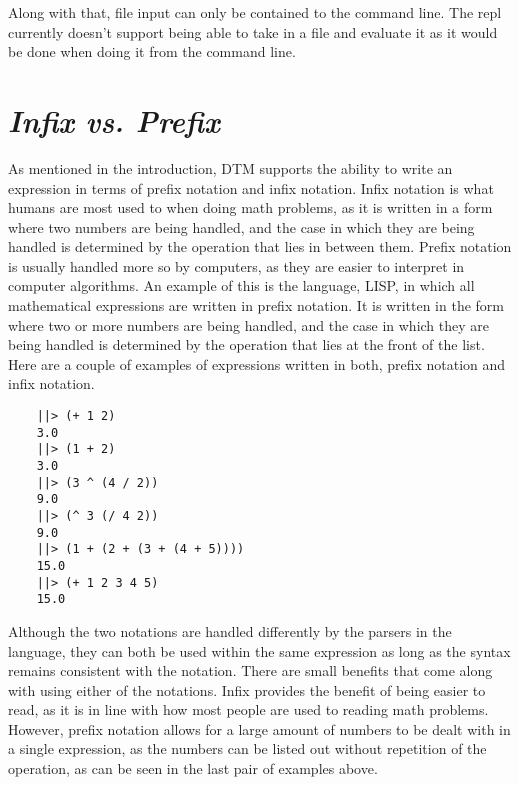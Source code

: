 \documentclass[10pt]{article}
\begin{document}
Along with that, file input can only be contained to the command line. The repl currently doesn’t support being able to take in a file and evaluate it as it would be done when doing it from the command line.

\section{\textit{Infix vs. Prefix}}

As mentioned in the introduction, DTM supports the ability to write an expression in terms of prefix notation and infix notation. Infix notation is what humans are most used to when doing math problems, as it is written in a form where two numbers are being handled, and the case in which they are being handled is determined by the operation that lies in between them. Prefix notation is usually handled more so by computers, as they are easier to interpret in computer algorithms. An example of this is the language, LISP, in which all mathematical expressions are written in prefix notation. It is written in the form where two or more numbers are being handled, and the case in which they are being handled is determined by the operation that lies at the front of the list. Here are a couple of examples of expressions written in both, prefix notation and infix notation.

\begin{verbatim}
    ||> (+ 1 2)
    3.0
    ||> (1 + 2)
    3.0
    ||> (3 ^ (4 / 2))
    9.0
    ||> (^ 3 (/ 4 2))
    9.0
    ||> (1 + (2 + (3 + (4 + 5))))
    15.0
    ||> (+ 1 2 3 4 5)
    15.0
\end{verbatim}

Although the two notations are handled differently by the parsers in the language, they can both be used within the same expression as long as the syntax remains consistent with the notation. There are small benefits that come along with using either of the notations. Infix provides the benefit of being easier to read, as it is in line with how most people are used to reading math problems. However, prefix notation allows for a large amount of numbers to be dealt with in a single expression, as the numbers can be listed out without repetition of the operation, as can be seen in the last pair of examples above.
\end{document}
